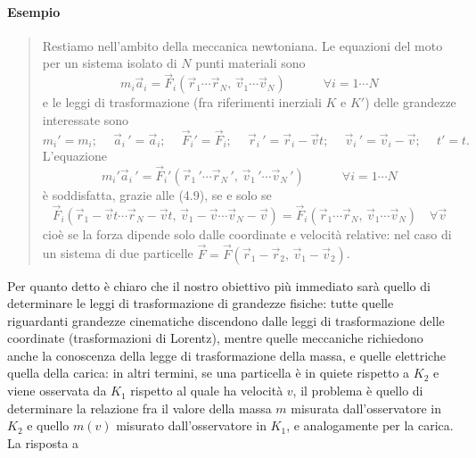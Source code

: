 \paragraph{Esempio}
\begin{quote}
  Restiamo nell'ambito della meccanica newtoniana. Le equazioni del moto per un
  sistema isolato di $N$ punti materiali sono
  \begin{equation}
    m_i\vec a_i=\vec F_i(\vec r_1\cdots\vec r_N,\,\vec v_1\cdots\vec v_N)
    \qquad\quad\forall i=1\cdots N
    \tag{4.8}
  \end{equation}
  e le leggi di trasformazione (fra riferimenti inerziali $K$ e $K'$) delle
  grandezze interessate sono
  \begin{equation}
    m_i'=m_i;\quad\ \vec a_i\,'=\vec a_i;
    \quad\ \vec F_i'=\vec F_i;\quad\ \vec r_i\,'=\vec r_i-\vec vt;
    \quad\ \vec v_i\,'=\vec v_i-\vec v;\quad\ t'=t.
    \tag{4.9}
  \end{equation}
  L'equazione
  \begin{equation}
    m_i'\vec a_i\,'
    =\vec F_i'(\vec r_1\,'\cdots\vec r_N\,',\,\vec v_1\,'\cdots\vec v_N\,')
    \qquad\quad\forall i=1\cdots N
    \tag{4.8'}
  \end{equation}
  \`e soddisfatta, grazie alle (4.9), se e solo se
  \begin{equation}
    \vec F_i(\vec r_1-\vec vt\cdots\vec r_N
    -\vec vt,\,\vec v_1-\vec v\cdots\vec v_N-\vec v)
    =\vec F_i(\vec r_1\cdots\vec r_N,\,\vec v_1\cdots\vec v_N)\quad\forall\vec v
    \tag{4.10}
  \end{equation}
  cio\`e se la forza dipende solo dalle coordinate e velocit\`a relative: nel
  caso di un sistema di due particelle
  $\vec F=\vec F(\vec r_1-\vec r_2,\,\vec v_1-\vec v_2)$.
\end{quote}
Per quanto detto \`e chiaro che il nostro obiettivo pi\`u immediato sar\`a
quello di determinare le leggi di trasformazione di grandezze fisiche: tutte
quelle riguardanti grandezze cinematiche discendono dalle leggi di
trasformazione delle coordinate (trasformazioni di Lorentz), mentre quelle
meccaniche richiedono anche la conoscenza della legge di trasformazione della
massa, e quelle elettriche quella della carica: in altri termini, se una
particella \`e in quiete rispetto a $K_2$ e viene osservata da $K_1$ rispetto al
quale ha velocit\`a $v$, il problema \`e quello di determinare la relazione fra
il valore della massa $m$ misurata dall'osservatore in $K_2$ e quello $m(v)$
misurato dall'osservatore in $K_1$, e analogamente per la carica. La risposta a
